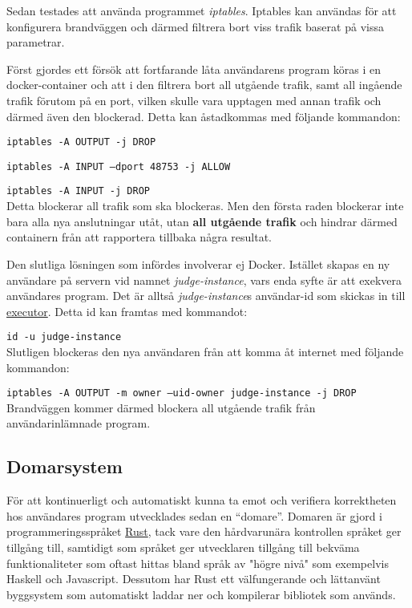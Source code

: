 \documentclass{article}
\begin{document}
Sedan testades att använda programmet \textit{iptables}. Iptables kan användas
för att konfigurera brandväggen och därmed filtrera bort viss trafik baserat på
vissa parametrar.

Först gjordes ett försök att fortfarande låta användarens program köras i en
docker-container och att i den filtrera bort all utgående trafik, samt all
ingående trafik förutom på en port, vilken skulle vara upptagen med annan
trafik och därmed även den blockerad. Detta kan åstadkommas med följande
kommandon:

\texttt{iptables -A OUTPUT -j DROP}

\texttt{iptables -A INPUT --dport 48753 -j ALLOW}

\texttt{iptables -A INPUT -j DROP}
\\
Detta blockerar all trafik som ska blockeras. Men den första raden blockerar
inte bara alla nya anslutningar utåt, utan \textbf{all utgående trafik} och
hindrar därmed containern från att rapportera tillbaka några resultat.

Den slutliga lösningen som infördes involverar ej Docker. Istället skapas
en ny användare på servern vid namnet \textit{judge-instance}, vars enda
syfte är att exekvera användares program. Det är alltså \textit{judge-instance}s
användar-id som skickas in till \hyperlink{executor}{executor}.
Detta id kan framtas med kommandot:

\texttt{id -u judge-instance}
\\
Slutligen blockeras den nya användaren från att komma åt internet med följande
kommandon:

\texttt{iptables -A OUTPUT -m owner --uid-owner judge-instance -j DROP}
\\
Brandväggen kommer därmed blockera all utgående trafik från användarinlämnade
program.

\subsection{Domarsystem}

För att kontinuerligt och automatiskt kunna ta emot och verifiera korrektheten
hos användares program utvecklades sedan en ``domare''. Domaren är gjord i
programmeringsspråket \href{https://rust-lang.org}{Rust}, tack vare den
hårdvarunära kontrollen språket ger tillgång till, samtidigt som språket ger
utvecklaren tillgång till bekväma funktionaliteter som oftast hittas bland språk
av "högre nivå" som exempelvis Haskell och Javascript. Dessutom har Rust ett
välfungerande och lättanvänt byggsystem som automatiskt laddar ner och
kompilerar bibliotek som används.
\end{document}
